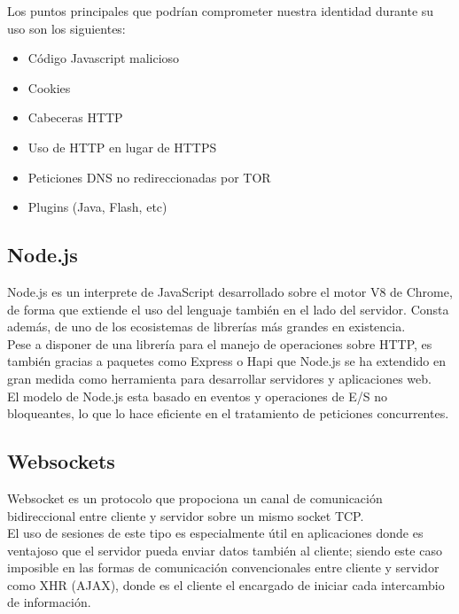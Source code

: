 Los puntos principales que podrían comprometer nuestra identidad durante su uso son los siguientes: \\

\begin{itemize}  
	\item  Código Javascript malicioso
	\item  Cookies
	\item  Cabeceras HTTP
	\item  Uso de HTTP en lugar de HTTPS
	\item Peticiones DNS no redireccionadas por TOR
	\item  Plugins (Java, Flash, etc)
\end{itemize}

\subsection {Node.js}

Node.js es un interprete de JavaScript desarrollado sobre el motor V8 de Chrome, de forma que extiende el uso del lenguaje también en el lado del servidor. Consta además, de uno de los ecosistemas de librerías más grandes en existencia. \\

Pese a disponer de una librería para el manejo de operaciones sobre HTTP, es también gracias a paquetes como Express o Hapi que Node.js se ha extendido en gran medida como herramienta para desarrollar servidores y aplicaciones web. \\
El modelo de Node.js esta basado en eventos y operaciones de E/S no bloqueantes, lo que lo hace eficiente en el tratamiento de peticiones concurrentes.

\subsection {Websockets}

Websocket es un protocolo que propociona un canal de comunicación bidireccional entre cliente y servidor sobre un mismo socket TCP. \\

El uso de sesiones de este tipo es especialmente útil en aplicaciones donde es ventajoso que el servidor pueda enviar datos también al cliente; siendo este caso imposible en las formas de comunicación convencionales entre cliente y servidor como XHR (AJAX), donde es el cliente el encargado de iniciar cada intercambio de información. \\

